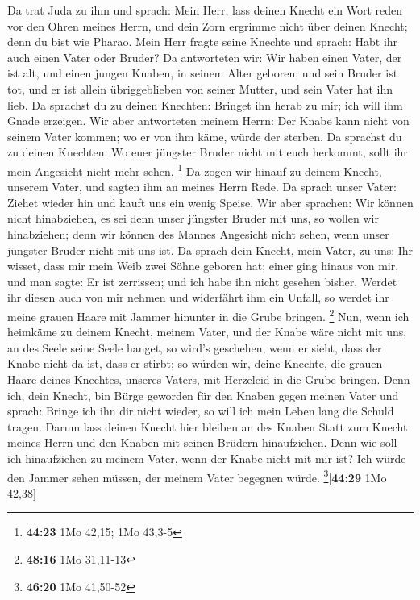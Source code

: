  Da trat Juda zu ihm und sprach: Mein Herr, lass deinen
Knecht ein Wort reden vor den Ohren meines Herrn, und dein Zorn ergrimme
nicht über deinen Knecht; denn du bist wie Pharao.  Mein
Herr fragte seine Knechte und sprach: Habt ihr auch einen Vater oder
Bruder?  Da antworteten wir: Wir haben einen Vater, der
ist alt, und einen jungen Knaben, in seinem Alter geboren; und sein
Bruder ist tot, und er ist allein übriggeblieben von seiner Mutter, und
sein Vater hat ihn lieb.  Da sprachst du zu deinen
Knechten: Bringet ihn herab zu mir; ich will ihm Gnade erzeigen.
 Wir aber antworteten meinem Herrn: Der Knabe kann nicht
von seinem Vater kommen; wo er von ihm käme, würde der sterben.
 Da sprachst du zu deinen Knechten: Wo euer jüngster
Bruder nicht mit euch herkommt, sollt ihr mein Angesicht nicht mehr
sehen. \footnote{\textbf{44:23} 1Mo 42,15; 1Mo 43,3-5} 
Da zogen wir hinauf zu deinem Knecht, unserem Vater, und sagten ihm an
meines Herrn Rede.  Da sprach unser Vater: Ziehet wieder
hin und kauft uns ein wenig Speise.  Wir aber sprachen:
Wir können nicht hinabziehen, es sei denn unser jüngster Bruder mit uns,
so wollen wir hinabziehen; denn wir können des Mannes Angesicht nicht
sehen, wenn unser jüngster Bruder nicht mit uns ist.  Da
sprach dein Knecht, mein Vater, zu uns: Ihr wisset, dass mir mein Weib
zwei Söhne geboren hat;  einer ging hinaus von mir, und
man sagte: Er ist zerrissen; und ich habe ihn nicht gesehen bisher.
 Werdet ihr diesen auch von mir nehmen und widerfährt ihm
ein Unfall, so werdet ihr meine grauen Haare mit Jammer hinunter in die
Grube bringen. \footnote{\textbf{48:16} 1Mo 31,11-13} 
Nun, wenn ich heimkäme zu deinem Knecht, meinem Vater, und der Knabe
wäre nicht mit uns, an des Seele seine Seele hanget,  so
wird's geschehen, wenn er sieht, dass der Knabe nicht da ist, dass er
stirbt; so würden wir, deine Knechte, die grauen Haare deines Knechtes,
unseres Vaters, mit Herzeleid in die Grube bringen.  Denn
ich, dein Knecht, bin Bürge geworden für den Knaben gegen meinen Vater
und sprach: Bringe ich ihn dir nicht wieder, so will ich mein Leben lang
die Schuld tragen.  Darum lass deinen Knecht hier bleiben
an des Knaben Statt zum Knecht meines Herrn und den Knaben mit seinen
Brüdern hinaufziehen.  Denn wie soll ich hinaufziehen zu
meinem Vater, wenn der Knabe nicht mit mir ist? Ich würde den Jammer
sehen müssen, der meinem Vater begegnen würde.
\footnote{\textbf{46:20} 1Mo 41,50-52}{[}\textbf{44:29} 1Mo 42,38{]}


